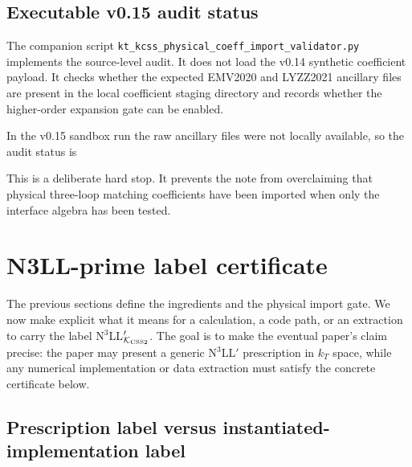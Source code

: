 \documentclass[11pt]{article}
\newcommand{\KCSS}{\mathcal K_{\rm CSS2}}
\begin{document}
\subsection{Executable v0.15 audit status}

The companion script
\texttt{kt\_kcss\_physical\_coeff\_import\_validator.py} implements the source-level audit.
It does not load the v0.14 synthetic coefficient payload.  It checks whether the expected
EMV2020 and LYZZ2021 ancillary files are present in the local coefficient staging directory and
records whether the higher-order expansion gate can be enabled.

In the v0.15 sandbox run the raw ancillary files were not locally available, so the audit
status is
\begin{center}
\end{center}
This is a deliberate hard stop.  It prevents the note from overclaiming that physical
three-loop matching coefficients have been imported when only the interface algebra has
been tested.


\section{N3LL-prime label certificate}
\label{sec:n3llprime-label-certificate}

The previous sections define the ingredients and the physical import gate.  We now make
explicit what it means for a calculation, a code path, or an extraction to carry the
label N$^3$LL$'_{\KCSS}$.  The goal is to make the eventual paper's claim precise: the
paper may present a generic N$^3$LL$'$ prescription in $k_T$ space, while any numerical
implementation or data extraction must satisfy the concrete certificate below.

\subsection{Prescription label versus instantiated-implementation label}
\end{document}
